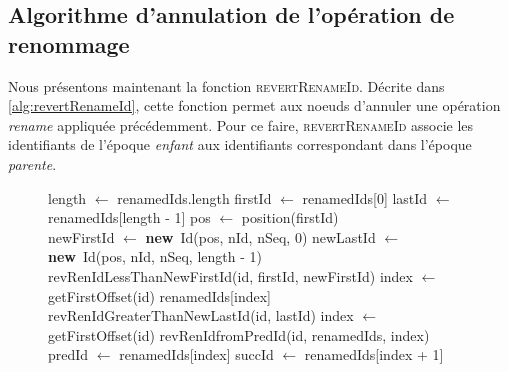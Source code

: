 \documentclass[12pt]{thesul}
\newcommand{\new}{\textbf{new}}
\begin{document}
\subsection{Algorithme d'annulation de l'opération de renommage}

\label{sec:reverting-rename-ops}

Nous présentons maintenant la fonction \textsc{revertRenameId}.
Décrite dans \autoref{alg:revertRenameId}, cette fonction permet aux noeuds d'annuler une opération \emph{rename} appliquée précédemment.
Pour ce faire, \textsc{revertRenameId} associe les identifiants de l'époque \emph{enfant} aux identifiants correspondant dans l'époque \emph{parente}.

\begin{figure}[!ht]
  \footnotesize
  \begin{algorithmic}
          \State length $\gets$ renamedIds.length
          \State firstId $\gets$ renamedIds[0]
          \State lastId $\gets$ renamedIds[length - 1]
          \State pos $\gets$ position(firstId)
          \\
          \State newFirstId $\gets$ \new~Id(pos, nId, nSeq, 0)
          \State newLastId $\gets$ \new~Id(pos, nId, nSeq, length - 1)
          \\
              \State \Return revRenIdLessThanNewFirstId(id, firstId, newFirstId)
              \State index $\gets$ getFirstOffset(id)
              \State \Return renamedIds[index]
              \State \Return revRenIdGreaterThanNewLastId(id, lastId)
          \Else
              \State index $\gets$ getFirstOffset(id)
              \State \Return revRenIdfromPredId(id, renamedIds, index)
          \EndIf
      \EndFunction
      \\
          \State predId $\gets$ renamedIds[index]
          \State succId $\gets$ renamedIds[index + 1]

\end{algorithmic}
\end{figure}
\end{document}
